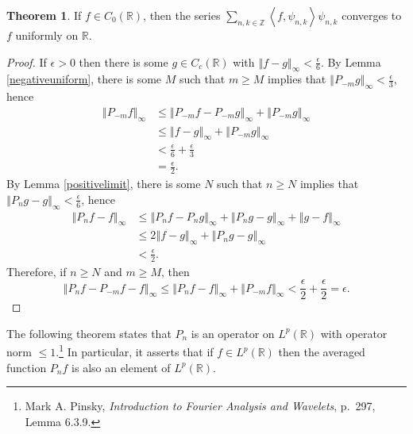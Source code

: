 \documentclass{article}
\newcommand{\inner}[2]{\left\langle #1, #2 \right\rangle}
\newcommand{\norm}[1]{\left\Vert #1 \right\Vert}
\theoremstyle{definition}
\newtheorem{theorem}{Theorem}
\theoremstyle{definition}
\begin{document}
\begin{theorem}
If $f \in C_0(\mathbb{R})$, then the series $\sum_{n,k \in \mathbb{Z}} \inner{f}{\psi_{n,k}} \psi_{n,k}$ 
converges to $f$ uniformly on $\mathbb{R}$.
\end{theorem}
\begin{proof}
If $\epsilon>0$ then there is some $g \in C_c(\mathbb{R})$ with $\norm{f-g}_\infty < \frac{\epsilon}{6}$. 
By Lemma \ref{negativeuniform}, there is some $M$ such that $m \geq M$ implies that
$\norm{P_{-m} g}_\infty < \frac{\epsilon}{3}$, hence
\begin{align*}
\norm{P_{-m}f}_\infty &\leq \norm{P_{-m}f-P_{-m}g}_\infty + \norm{P_{-m}g}_\infty\\
&\leq \norm{f-g}_\infty + \norm{P_{-m}g}_\infty\\
&<\frac{\epsilon}{6}+\frac{\epsilon}{3}\\
&=\frac{\epsilon}{2}.
\end{align*}
By Lemma \ref{positivelimit}, there is some $N$ such that $n \geq N$ implies that
$\norm{P_ng-g}_\infty <\frac{\epsilon}{6}$, hence
\begin{align*}
\norm{P_nf-f}_\infty& \leq \norm{P_nf-P_ng}_\infty + \norm{P_ng-g}_\infty + \norm{g-f}_\infty\\
&\leq 2\norm{f-g}_\infty + \norm{P_ng-g}_\infty\\
&<\frac{\epsilon}{2}.
\end{align*}
Therefore, if $n \geq N$ and $m \geq M$, then
\[
\norm{P_nf-P_{-m}f-f}_\infty \leq \norm{P_nf-f}_\infty + \norm{P_{-m}f}_\infty < 
\frac{\epsilon}{2}+\frac{\epsilon}{2}=\epsilon.
\]
\end{proof}


The following theorem states that $P_n$ is an operator on $L^p(\mathbb{R})$ with operator norm $\leq 1$.\footnote{Mark A. Pinsky, {\em Introduction to Fourier Analysis and Wavelets}, p.~297, Lemma 6.3.9.} In particular, it asserts that if $f \in L^p(\mathbb{R})$ then the averaged function $P_n f$ is also an element of $L^p(\mathbb{R})$.
\end{document}
